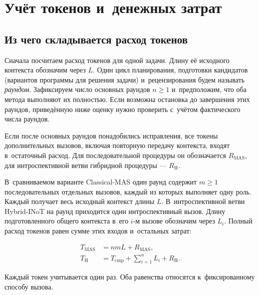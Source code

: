 \section{Учёт токенов и~денежных затрат}\label{sec:analysis}
\subsection{Из чего складывается расход токенов}
Сначала посчитаем расход токенов для одной задачи. Длину её исходного контекста обозначим через $L$. Один цикл планирования, подготовки кандидатов (вариантов программы для решения задачи) и~рецензирования будем называть \emph{раундом}. Зафиксируем число основных раундов $n\ge1$ и~предположим, что оба метода выполняют их полностью. Если возможна остановка до завершения этих раундов, приведённую ниже оценку нужно проверить с~учётом фактического числа раундов.

Если после основных раундов понадобились исправления, все токены дополнительных вызовов, включая повторную передачу контекста, входят в~остаточный расход. Для последовательной процедуры он обозначается $R_{\mathrm{MAS}}$, для интроспективной ветви гибридной процедуры --- $R_{\mathrm H}$.

В~сравниваемом варианте Classical-MAS один раунд содержит $m\ge1$ последовательных отдельных вызовов, каждый из которых выполняет одну роль. Каждый получает весь исходный контекст длины $L$. В~интроспективной ветви Hybrid-INoT на раунд приходится один интроспективный вызов. Длину подготовленного общего контекста в~его $i$-м вызове обозначим через $L_i$. Полный расход токенов равен сумме этих входов и~остальных затрат:
\begin{formulakey}
\begin{align}
T_{\mathrm{MAS}}&=nmL+R_{\mathrm{MAS}},\label{eq:ledger-mas}\\
T_{\mathrm{H}}&=T_{\mathrm{cmp}}+\sum_{i=1}^{n}L_i+R_{\mathrm{H}}.\label{eq:ledger-h}
\end{align}
\begin{symbols}
\end{symbols}
\end{formulakey}
Каждый токен учитывается один раз. Оба равенства относятся к~фиксированному способу вызова.

